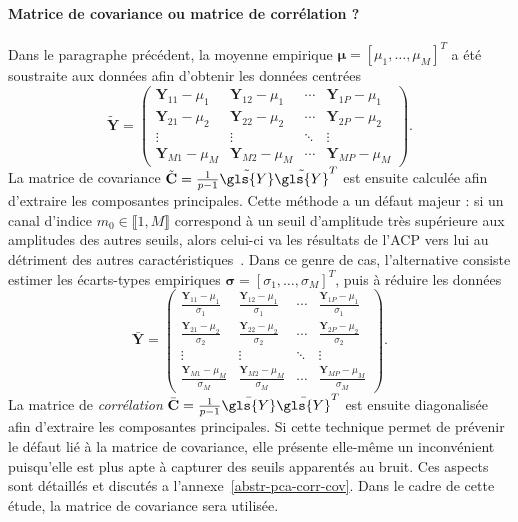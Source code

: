     \paragraph{Matrice de covariance ou matrice de corrélation ?} Dans le paragraphe précédent, la moyenne empirique $\boldsymbol\mu = [\mu_1,\dots,\mu_M]^T$ a été soustraite aux données afin d'obtenir les données centrées
    \begin{equation}
     \tilde{\mathbf{Y}} =
        \begin{pmatrix}
        \mathbf{Y}_{1 1} - \mu_1&\mathbf{Y}_{1 2} - \mu_1&\cdots&\mathbf{Y}_{1 P} - \mu_1\\
        \mathbf{Y}_{2 1} - \mu_2&\mathbf{Y}_{2 2} - \mu_2&\cdots&\mathbf{Y}_{2 P} - \mu_2\\
        \vdots&\vdots&\ddots&\vdots\\
        \mathbf{Y}_{M 1} - \mu_M&\mathbf{Y}_{M 2} - \mu_M&\cdots&\mathbf{Y}_{M P} - \mu_M
        \end{pmatrix}.
    \end{equation}
    La matrice de covariance $\tilde{\mathbf{C}} = \frac{1}{p-1}\tilde{\gls{Y}}\tilde{\gls{Y}}^T$ est ensuite calculée afin d'extraire les composantes principales. Cette méthode a un défaut majeur : si un canal d'indice $m_0\in\llbracket 1,M\rrbracket$ correspond à un seuil d'amplitude très supérieure aux amplitudes des autres seuils, alors celui-ci va  les résultats de l'ACP vers lui au détriment des autres caractéristiques~\cite[Section~3.3]{jolliffe2002springer}.
    Dans ce genre de cas, l'alternative consiste estimer les écarts-types empiriques $\boldsymbol\sigma=[\sigma_1,\dots,\sigma_M]^T$, puis à réduire les données
    \begin{equation}
    \bar{\mathbf{Y}} =
    \begin{pmatrix}
    \frac{\mathbf{Y}_{1 1} - \mu_1}{\sigma_1}&
    \frac{\mathbf{Y}_{1 2} - \mu_1}{\sigma_1}&
    \cdots&
    \frac{\mathbf{Y}_{1 P} - \mu_1}{\sigma_1}\\
    \frac{\mathbf{Y}_{2 1} - \mu_2}{\sigma_2}&
    \frac{\mathbf{Y}_{2 2} - \mu_2}{\sigma_2}&
    \cdots&
    \frac{\mathbf{Y}_{2 P} - \mu_2}{\sigma_2}\\
    \vdots&\vdots&\ddots&\vdots\\
    \frac{\mathbf{Y}_{M 1} - \mu_M}{\sigma_M}&
    \frac{\mathbf{Y}_{M 2} - \mu_M}{\sigma_M}&
    \cdots&
    \frac{\mathbf{Y}_{M P} - \mu_M}{\sigma_M}
    \end{pmatrix}.
    \end{equation}
    La matrice de \emph{corrélation} $\bar{\mathbf{C}} = \frac{1}{p-1}\bar{\gls{Y}}\bar{\gls{Y}}^T$ est ensuite diagonalisée afin d'extraire les composantes principales. %
    Si cette technique permet de prévenir le défaut lié à la matrice de covariance, elle présente elle-même un inconvénient puisqu'elle est plus apte à capturer des seuils apparentés au bruit.
    Ces aspects sont détaillés et discutés a l'annexe~\ref{abstr-pca-corr-cov}. Dans le cadre de cette étude, la matrice de covariance sera utilisée.


